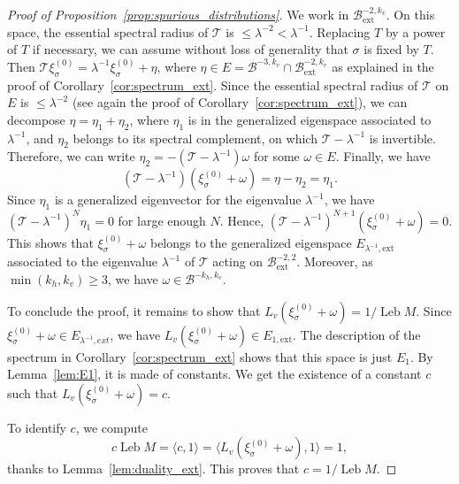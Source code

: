 \documentclass[10pt]{amsart}
\newcommand{\ext}{\mathrm{ext}}
\newcommand{\boB}{\mathcal{B}}
\newcommand{\boT}{\mathcal{T}}
\DeclareMathOperator{\Leb}{Leb}
\theoremstyle{definition}
\numberwithin{equation}{section}
\begin{document}
\begin{proof}[Proof of Proposition~\ref{prop:spurious_distributions}]
We work in $\boB_{\ext}^{-2, k_v}$. On this space, the essential spectral
radius of $\boT$ is $\leq \lambda^{-2} < \lambda^{-1}$. Replacing $T$ by a
power of $T$ if necessary, we can assume without loss of generality that
$\sigma$ is fixed by $T$. Then $\boT \xi^{(0)}_\sigma = \lambda^{-1}
\xi^{(0)}_\sigma + \eta$, where $\eta \in E = \boB^{-3, k_v} \cap
\boB_{\ext}^{-2,k_v}$ as explained in the proof of
Corollary~\ref{cor:spectrum_ext}. Since the essential spectral radius of
$\boT$ on $E$ is $\leq \lambda^{-2}$ (see again the proof of
Corollary~\ref{cor:spectrum_ext}), we can decompose $\eta = \eta_1 + \eta_2$, where $\eta_1$ is in the generalized eigenspace associated to $\lambda^{-1}$,
and $\eta_2$ belongs to its spectral complement, on which $\boT-\lambda^{-1}$
is invertible. Therefore, we can write $\eta_2 = -(\boT-\lambda^{-1}) \omega$
for some $\omega \in E$. Finally, we have
\begin{equation*}
(\boT - \lambda^{-1}) (\xi^{(0)}_\sigma + \omega) = \eta - \eta_2 = \eta_1.
\end{equation*}
Since $\eta_1$ is a generalized eigenvector for the eigenvalue
$\lambda^{-1}$, we have $(\boT-\lambda^{-1})^N \eta_1 = 0$ for large enough
$N$. Hence, $(\boT - \lambda^{-1})^{N+1} (\xi^{(0)}_\sigma + \omega) = 0$.
This shows that $\xi^{(0)}_\sigma + \omega$ belongs to the generalized
eigenspace $E_{\lambda^{-1}, \ext}$ associated to the eigenvalue
$\lambda^{-1}$ of $\boT$ acting on $\boB^{-2, 2}_{\ext}$. Moreover, as
$\min(k_h, k_v)\geq 3$, we have $\omega \in \boB^{-k_h, k_v}$.

To conclude the proof, it remains to show that $L_v(\xi^{(0)}_\sigma +
\omega) = 1/\Leb M$. Since $\xi^{(0)}_\sigma + \omega \in E_{\lambda^{-1},
ext}$, we have $L_v(\xi^{(0)}_\sigma + \omega) \in E_{1,\ext}$. The
description of the spectrum in Corollary~\ref{cor:spectrum_ext} shows that
this space is just $E_1$. By Lemma~\ref{lem:E1}, it is made of constants. We
get the existence of a constant $c$ such that $L_v(\xi^{(0)}_\sigma + \omega)
= c$.

To identify $c$, we compute
\begin{equation*}
c \Leb M = \langle c, 1 \rangle = \langle L_v(\xi^{(0)}_\sigma + \omega), 1\rangle
= 1,
\end{equation*}
thanks to Lemma~\ref{lem:duality_ext}. This proves that $c = 1/\Leb M$.
\end{proof}
\end{document}
